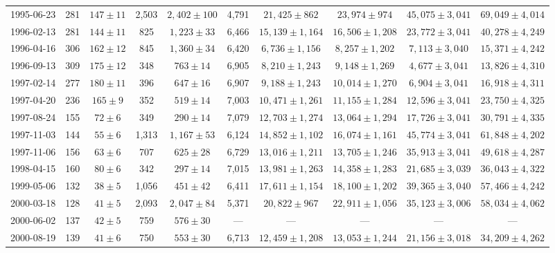\documentclass[12pt,letterpaper]{article}
\begin{document}
\begin{landscape}
\begin{longtable}{cccccccccc}
	{1995-06-23} & 281 & {$147  \pm  11$} & 2,503 & {$2,402 \pm 100$} & 4,791 & {$21,425 \pm 862$} & {$23,974 \pm 974$} & {$45,075 \pm 3,041$} & {$69,049 \pm 4,014$} \\
	{1996-02-13} & 281 & {$144  \pm  11$} & 825 & {$1,223 \pm 33$} & 6,466 & {$15,139 \pm 1,164$} & {$16,506 \pm 1,208$} & {$23,772 \pm 3,041$} & {$40,278 \pm 4,249$} \\
	{1996-04-16} & 306 & {$162  \pm  12$} & 845 & {$1,360 \pm 34$} & 6,420 & {$6,736 \pm 1,156$} & {$8,257 \pm 1,202$} & {$7,113 \pm 3,040$} & {$15,371 \pm 4,242$} \\
	{1996-09-13} & 309 & {$175  \pm  12$} & 348 & {$763 \pm 14$} & 6,905 & {$8,210 \pm 1,243$} & {$9,148 \pm 1,269$} & {$4,677 \pm 3,041$} & {$13,826 \pm 4,310$} \\
	{1997-02-14} & 277 & {$180  \pm  11$} & 396 & {$647 \pm 16$} & 6,907 & {$9,188 \pm 1,243$} & {$10,014 \pm 1,270$} & {$6,904 \pm 3,041$} & {$16,918 \pm 4,311$} \\
	{1997-04-20} & 236 & {$165  \pm  9$} & 352 & {$519 \pm 14$} & 7,003 & {$10,471 \pm 1,261$} & {$11,155 \pm 1,284$} & {$12,596 \pm 3,041$} & {$23,750 \pm 4,325$} \\
	{1997-08-24} & 155 & {$72  \pm  6$} & 349 & {$290 \pm 14$} & 7,079 & {$12,703 \pm 1,274$} & {$13,064 \pm 1,294$} & {$17,726 \pm 3,041$} & {$30,791 \pm 4,335$} \\
	{1997-11-03} & 144 & {$55  \pm  6$} & 1,313 & {$1,167 \pm 53$} & 6,124 & {$14,852 \pm 1,102$} & {$16,074 \pm 1,161$} & {$45,774 \pm 3,041$} & {$61,848 \pm 4,202$} \\
	{1997-11-06} & 156 & {$63  \pm  6$} & 707 & {$625 \pm 28$} & 6,729 & {$13,016 \pm 1,211$} & {$13,705 \pm 1,246$} & {$35,913 \pm 3,041$} & {$49,618 \pm 4,287$} \\
	{1998-04-15} & 160 & {$80  \pm  6$} & 342 & {$297 \pm 14$} & 7,015 & {$13,981 \pm 1,263$} & {$14,358 \pm 1,283$} & {$21,685 \pm 3,039$} & {$36,043 \pm 4,322$} \\
	{1999-05-06} & 132 & {$38  \pm  5$} & 1,056 & {$451 \pm 42$} & 6,411 & {$17,611 \pm 1,154$} & {$18,100 \pm 1,202$} & {$39,365 \pm 3,040$} & {$57,466 \pm 4,242$} \\
	{2000-03-18} & 128 & {$41  \pm  5$} & 2,093 & {$2,047 \pm 84$} & 5,371 & {$20,822 \pm 967$} & {$22,911 \pm 1,056$} & {$35,123 \pm 3,006$} & {$58,034 \pm 4,062$} \\
	{2000-06-02} & 137 & {$42  \pm  5$} & 759 & {$576 \pm 30$} & --- & --- & --- & --- & --- \\
	{2000-08-19} & 139 & {$41  \pm  6$} & 750 & {$553 \pm 30$} & 6,713 & {$12,459 \pm 1,208$} & {$13,053 \pm 1,244$} & {$21,156 \pm 3,018$} & {$34,209 \pm 4,262$} \\

\end{longtable}
\end{landscape}
\end{document}

